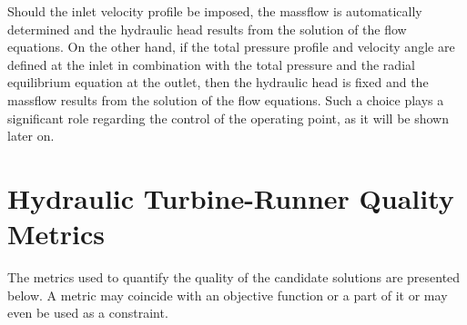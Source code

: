 Should the inlet velocity profile be imposed, the massflow is automatically determined and the hydraulic head results from the solution of the flow equations. On the other hand, if the total pressure profile and velocity angle are defined at the inlet in combination with the total pressure and the radial equilibrium equation at the outlet, then the hydraulic head is fixed and the massflow results from the solution of the flow equations. Such a choice  plays a significant role regarding the control of the operating point, as it will be shown later on.        

 








\section{Hydraulic Turbine-Runner Quality Metrics}
\label{metrics}
The metrics used to quantify the quality of the candidate solutions are presented below. A metric may coincide with an objective function or a part of it or may even be used as a constraint.

